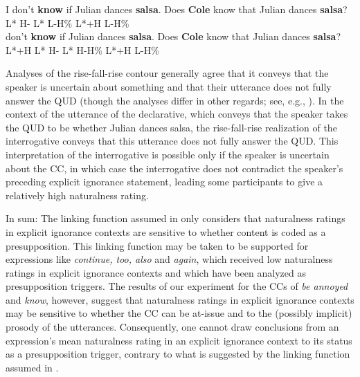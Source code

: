 \documentclass[11pt,fleqn]{article}
\newcommand{\6}{\mbox{$[\hspace*{-.6mm}[$}}
\newcommand{\9}{\mbox{$]\hspace*{-.6mm}]$}}
\begin{document}
\begin{exe}
\ex\label{pros} 
\begin{xlist}
\ex \gll I don't {\bf know} if Julian dances {\bf salsa}. Does {\bf Cole} know that Julian dances {\bf salsa}? 
\\ {} {} {L* H-} {} {} {} {L* L-H\%} {} L*+H {} {} {} {} {\hspace*{.2cm} L-H\%} \\ \glt 
\ex {} don't {\bf know} if Julian dances {\bf salsa}. Does {\bf Cole} know that Julian dances {\bf salsa}? 
\\ L*+H {} {L* H-} {} {} {} {L* H-H\%} {} L*+H {} {} {} {} {\hspace*{.2cm} L-H\%} \\ \glt 
\end{xlist}
\end{exe}
Analyses of the rise-fall-rise contour generally agree that it conveys that the speaker is uncertain about something and that their utterance does not fully answer the QUD (though the analyses differ in other regards; see, e.g., \citealt{ward-hirschberg85,buering97,buering03,wagner-etal2013}). In the context of the utterance of the declarative, which conveys that the speaker takes the QUD to be whether Julian dances salsa, the rise-fall-rise realization of the interrogative conveys that this utterance does not fully answer the QUD. This interpretation of the interrogative is possible only if the speaker is uncertain about the CC, in which case the interrogative does not contradict the speaker's preceding explicit ignorance statement, leading some participants to give a relatively high naturalness rating.

In sum: The linking function assumed in \citealt{mandelkern-etal2020} only considers that naturalness ratings in explicit ignorance contexts are sensitive to whether content is coded as a presupposition. This linking function may be taken to be supported for expressions like {\em continue, too, also} and {\em again}, which received low naturalness ratings in explicit ignorance contexts and which have been analyzed as presupposition triggers. The results of our experiment for the CCs of {\em be annoyed} and {\em know}, however, suggest that naturalness ratings in explicit ignorance contexts may be sensitive to whether the CC can be at-issue and to the (possibly implicit) prosody of the utterances. Consequently, one cannot draw conclusions from an expression's mean naturalness rating in an explicit ignorance context to its status as a presupposition trigger, contrary to what is suggested by the linking function assumed in \citealt{mandelkern-etal2020}.
\end{document}
